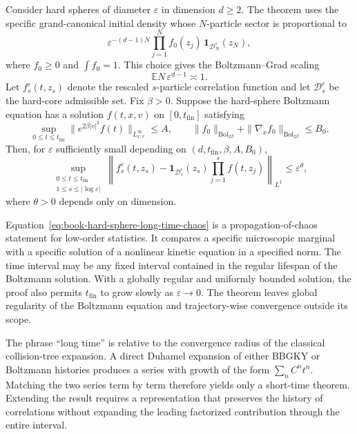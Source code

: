 Consider hard spheres of diameter $\varepsilon$ in dimension $d\geq2$.  The theorem uses the
specific grand-canonical initial density whose $N$-particle sector is proportional to
\begin{equation}
\varepsilon^{-(d-1)N}
\prod_{j=1}^{N}f_0(z_j)\,
\mathbf1_{\mathcal D_N^\varepsilon}(z_N),
\label{eq:book-hard-sphere-initial-ensemble}
\end{equation}
where $f_0\geq0$ and $\int f_0=1$.  This choice gives the Boltzmann--Grad scaling
\begin{equation}
\mathbb E N\,\varepsilon^{d-1}\asymp1.
\label{eq:book-boltzmann-grad-scaling}
\end{equation}
Let $f_s^\varepsilon(t,z_s)$ denote the rescaled $s$-particle correlation function and let
$\mathcal D_s^\varepsilon$ be the hard-core admissible set.  Fix $\beta>0$.  Suppose the hard-sphere
Boltzmann equation has a solution $f(t,x,v)$ on $[0,t_{\mathrm{fin}}]$ satisfying
\begin{equation}
\sup_{0\leq t\leq t_{\mathrm{fin}}}
\|e^{2\beta|v|^2}f(t)\|_{L^\infty_{x,v}}\leq A,
\qquad
\|f_0\|_{\mathrm{Bol}_{2\beta}}
+\|\nabla_xf_0\|_{\mathrm{Bol}_{2\beta}}\leq B_0.
\label{eq:book-hard-sphere-solution-assumptions}
\end{equation}
Then, for $\varepsilon$ sufficiently small depending on
$(d,t_{\mathrm{fin}},\beta,A,B_0)$,
\begin{equation}
\sup_{\substack{0\leq t\leq t_{\mathrm{fin}}\\
                  1\leq s\leq |\log\varepsilon|}}
\left\|
f_s^\varepsilon(t,z_s)
-\mathbf1_{\mathcal D_s^\varepsilon}(z_s)
 \prod_{j=1}^{s} f(t,z_j)
\right\|_{L^1}
\leq \varepsilon^\theta ,
\label{eq:book-hard-sphere-long-time-chaos}
\end{equation}
where $\theta>0$ depends only on dimension.

Equation~\ref{eq:book-hard-sphere-long-time-chaos} is a propagation-of-chaos statement for low-order
statistics.  It compares a specific microscopic marginal with a specific solution of a nonlinear
kinetic equation in a specified norm.  The time interval may be any fixed interval contained in
the regular lifespan of the Boltzmann solution.  With a globally regular and uniformly bounded
solution, the proof also permits $t_{\mathrm{fin}}$ to grow slowly as $\varepsilon\to0$.  The
theorem leaves global regularity of the Boltzmann equation and trajectory-wise convergence outside
its scope.

The phrase ``long time'' is relative to the convergence radius of the classical collision-tree
expansion.  A direct Duhamel expansion of either BBGKY or Boltzmann histories produces a series with
growth of the form $\sum_n C^n t^n$.  Matching the two series term by term therefore yields only a
short-time theorem.  Extending the result requires a representation that preserves the history of
correlations without expanding the leading factorized contribution through the entire interval.

